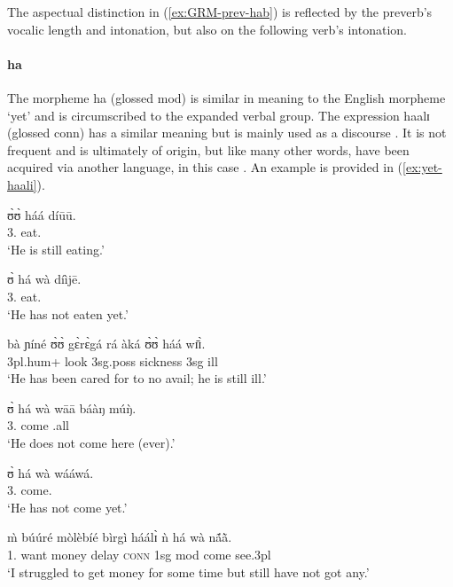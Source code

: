 \begin{exe}
\begin{exe}
\begin{exe}
\begin{exe}
\begin{exe}
\begin{exe}
\begin{exe}
\begin{exe}
\begin{exe}
\begin{exe}
\begin{exe}
\begin{exe}
\z 
 \z

The aspectual distinction in (\ref{ex:GRM-prev-hab}) is reflected by the preverb's vocalic length and intonation, but also on the following verb's intonation.




\paragraph{ha}
\label{sec:GRM-preverb-yet}

The morpheme {\sls ha} (glossed {\sc mod}) is similar in meaning to the English morpheme `yet'  and is circumscribed to the expanded verbal group. The expression {\sls haalɪ}  (glossed {\sc conn}) has a similar meaning but is mainly used as a discourse . It is not frequent and is ultimately of  origin, but like many other words, have been acquired via another language, in this case  \citep[157-158]{bald08}. An example is provided in (\ref{ex:yet-haali}).

\ea
\ea\label{ex:vp32.24}
\gll ʊ̀ʊ̀ háá díūū.\\
  {3.\sg}  {\mod} eat.\foc\\
\glt  `He is still eating.' 


\ex\label{ex:vp20.3.2.}
\gll ʊ̀ há wà díìjē.\\
 {3.\sg}  {\mod} {\neg} eat.{\pfv}\\
\glt  `He has not eaten yet.'


\ex\label{ex:vp21.2.1.}
\gll bà ɲíné ʊ̀ʊ̀ gɛ̀rɛ̀gá rá àká ʊ̀ʊ̀ háá wɪ̄ɪ̀.\\
 {\sc 3pl.hum+} look {\sc 3sg.poss} sickness {\foc} {\conn}  {\sc 3sg}
{\mod} ill\\
\glt  `He has been cared for to no avail; he is still ill.' 


\ex\label{ex:vp20.1.1.}
\gll ʊ̀ há  wà wāā báàŋ múŋ̀.\\
    {3.\sg} {\mod}  {\neg} come {\dem} {\quant}.all\\
\glt  `He does not come here (ever).' 

\ex\label{ex:vp20.3.1.}
\gll ʊ̀ há wà wááwá.\\
    {3.\sg} {\mod}   {\neg} come.{\pfv}\\
\glt  `He has not come yet.' 

\ex\label{ex:yet-haali}
 \gll m̀ búúré mòlèbíé bìrgì háálɪ̀ ǹ há wà nã́ã̀.\\
  {1.\sg} want money delay \textsc{conn}  {\sc 1sg}  {\sc mod}  come see.{\sc 3pl} \\
 \glt  `I struggled to get money for some time but still have not got any.' 
 

\end{exe}
\end{exe}
\end{exe}
\end{exe}
\end{exe}
\end{exe}
\end{exe}
\end{exe}
\end{exe}
\end{exe}
\end{exe}
\end{exe}
